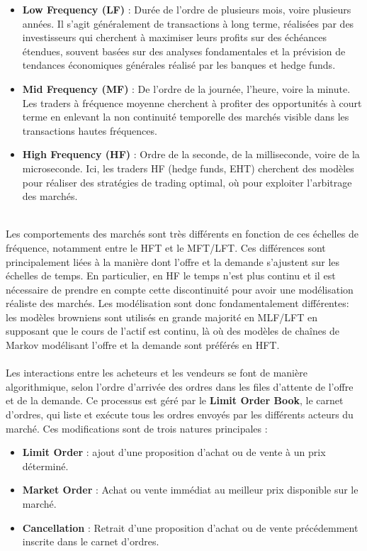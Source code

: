 \documentclass[12pt,a4paper]{article}
\theoremstyle{definition}
\theoremstyle{remark}
\begin{document}
    \begin{itemize}
        \item \textbf{Low Frequency (LF)} : Durée de l'ordre de plusieurs mois, voire plusieurs années. Il s'agit généralement de transactions à long terme, réalisées par des investisseurs qui cherchent à maximiser leurs profits sur des échéances étendues, souvent basées sur des analyses fondamentales et la prévision de tendances économiques générales réalisé par les banques et hedge funds.

        \item \textbf{Mid Frequency (MF)} : De l'ordre de la journée, l'heure, voire la minute. Les traders à fréquence moyenne cherchent à profiter des opportunités à court terme en enlevant la non continuité temporelle des marchés visible dans les transactions hautes fréquences. 

        \item \textbf{High Frequency (HF)} : Ordre de la seconde, de la milliseconde, voire de la microseconde. Ici, les traders HF (hedge funds, EHT) cherchent des modèles pour réaliser des stratégies de trading optimal, où pour exploiter l'arbitrage des marchés.
    \end{itemize}
    \\
    Les comportements des marchés sont très différents en fonction de ces échelles de fréquence, notamment entre le HFT et le MFT/LFT. Ces différences sont principalement liées à la manière dont l'offre et la demande s'ajustent sur les échelles de temps. En particulier, en HF le temps n'est plus continu et il est nécessaire de prendre en compte cette discontinuité pour avoir une modélisation réaliste des marchés. Les modélisation sont donc fondamentalement différentes: les modèles browniens sont utilisés en grande majorité en MLF/LFT en supposant que le cours de l'actif est continu, là où des modèles de chaînes de Markov modélisant l'offre et la demande sont préférés en HFT.
    \\
    \\
    Les interactions entre les acheteurs et les vendeurs se font de manière algorithmique, selon l'ordre d'arrivée des ordres dans les files d'attente de l'offre et de la demande. Ce processus est géré par le \textbf{Limit Order Book}, le carnet d'ordres, qui liste et exécute tous les ordres envoyés par les différents acteurs du marché. Ces modifications sont de trois natures principales :

    \begin{itemize}
        \item \textbf{Limit Order} : ajout d'une proposition d'achat ou de vente à un prix déterminé. 

        \item \textbf{Market Order} : Achat ou vente immédiat au meilleur prix disponible sur le marché. 

        \item \textbf{Cancellation} : Retrait d'une proposition d'achat ou de vente précédemment inscrite dans le carnet d'ordres.
    \end{itemize}
\end{document}
